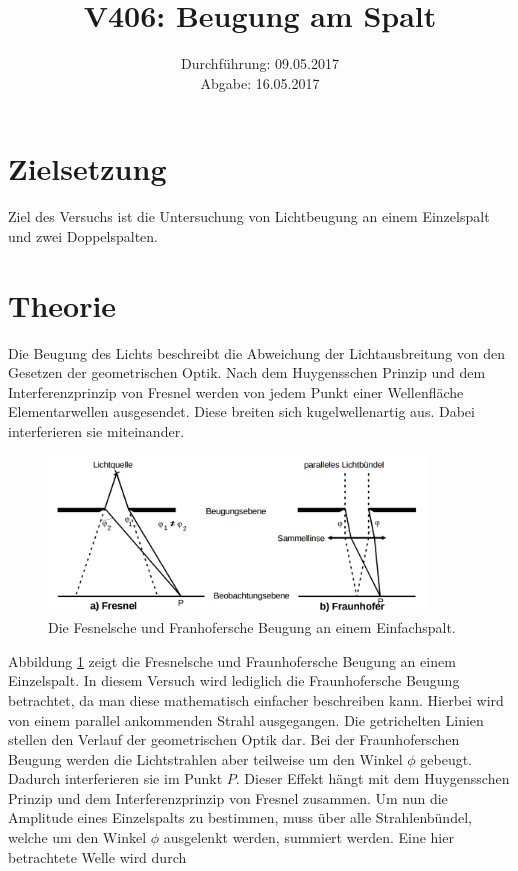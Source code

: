 \documentclass[
  bibliography=totoc,     %
  captions=tableheading,  %
  titlepage=firstiscover, %
]{scrartcl}
\title{V406: Beugung am Spalt}
\author{
  Simon Schulte
  \texorpdfstring{
    \\
    \href{mailto:simon.schulte@udo.edu}{simon.schulte@udo.edu}
  }{}
  \texorpdfstring{\and}{, }
  Tim Sedlaczek
  \texorpdfstring{
    \\
    \href{mailto:tim.sedlaczek@udo.edu}{tim.sedlaczek@udo.edu}
  }{}
}
\date{Durchführung: 09.05.2017\\
      Abgabe: 16.05.2017}
\begin{document}
\maketitle
\thispagestyle{empty}
\tableofcontents
\newpage
\setcounter{page}{1}
\section{Zielsetzung}
\label{sec:zielsetzung}
Ziel des Versuchs ist die Untersuchung von Lichtbeugung an einem Einzelspalt und zwei Doppelspalten.
\section{Theorie}
\label{sec:theorie}
Die Beugung des Lichts beschreibt die Abweichung der Lichtausbreitung von den
Gesetzen der geometrischen Optik. Nach dem Huygensschen Prinzip und dem Interferenzprinzip von Fresnel werden von jedem Punkt einer Wellenfläche Elementarwellen ausgesendet. Diese breiten sich kugelwellenartig aus. Dabei interferieren sie miteinander.
\begin{figure}[htb]
  \centering
  \includegraphics[width=0.9\textwidth]{V4061.png}
  \caption{Die Fesnelsche und Franhofersche Beugung an einem Einfachspalt. \cite{anleitung}}
  \label{fig:V4061}
\end{figure}
Abbildung \ref{fig:V4061} zeigt die Fresnelsche und Fraunhofersche Beugung an einem Einzelspalt. In diesem Versuch wird lediglich die Fraunhofersche Beugung betrachtet, da man diese mathematisch einfacher beschreiben kann. Hierbei wird von einem parallel ankommenden Strahl ausgegangen. Die getrichelten Linien stellen den Verlauf der geometrischen Optik dar. Bei der Fraunhoferschen Beugung werden die Lichtstrahlen aber teilweise um den Winkel $\phi$ gebeugt. Dadurch interferieren sie im Punkt $P$. Dieser Effekt hängt mit dem Huygensschen Prinzip und dem Interferenzprinzip von Fresnel zusammen. Um nun die Amplitude eines Einzelspalts zu bestimmen, muss über alle Strahlenbündel, welche um den Winkel $\phi$ ausgelenkt werden, summiert werden. Eine hier betrachtete Welle wird durch
\end{document}
